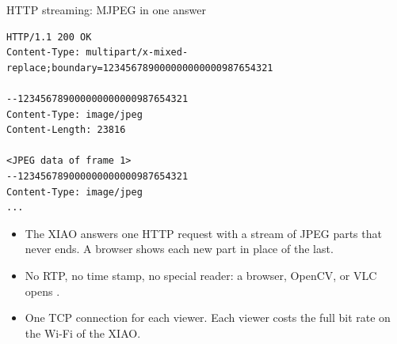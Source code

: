 \begin{frame}[fragile]{HTTP streaming: MJPEG in one answer}
\begin{lstlisting}[style=shell, basicstyle=\ttfamily\scriptsize]
HTTP/1.1 200 OK
Content-Type: multipart/x-mixed-replace;boundary=123456789000000000000987654321

--123456789000000000000987654321
Content-Type: image/jpeg
Content-Length: 23816

<JPEG data of frame 1>
--123456789000000000000987654321
Content-Type: image/jpeg
...
\end{lstlisting}
  \small
  \begin{itemize}
    \item The XIAO answers one HTTP request with a stream of JPEG parts that
          never ends. A browser shows each new part in place of the last.
    \item No RTP, no time stamp, no special reader: a browser, OpenCV, or
          VLC opens .
    \item One TCP connection for each viewer. Each viewer costs the full bit
          rate on the Wi-Fi of the XIAO.
  \end{itemize}
\end{frame}

